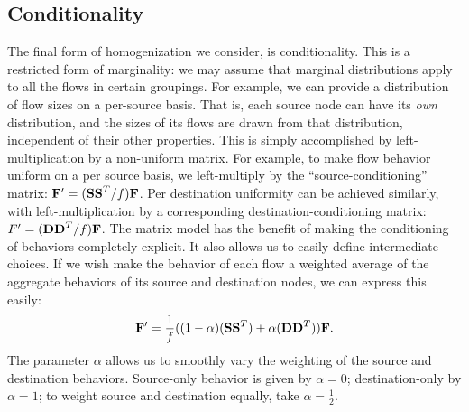 \documentclass[twocolumn,final]{svjour3}
\begin{document}
\subsection{Conditionality}

The final form of homogenization we consider, is conditionality. This is a restricted form of marginality: we may assume that marginal distributions apply to all the flows in certain groupings. For example, we can provide a distribution of flow sizes on a per-source basis. That is, each source node can have its \textit{own} distribution, and the sizes of its flows are drawn from that distribution, independent of their other properties. This is simply accomplished by left-multiplication by a non-uniform matrix. For example, to make flow behavior uniform on a per source basis, we left-multiply by the ``source-conditioning'' matrix: $\mathbf{F}'=({\mathbf{SS}}^T/f)\mathbf{F}$. Per destination uniformity can be achieved similarly, with left-multiplication by a corresponding destination-conditioning matrix: $F'=({\mathbf{DD}}^T/f)\mathbf{F}$.
The matrix model has the benefit of making the conditioning of behaviors completely explicit. It also allows us to easily define intermediate choices. If we wish make the behavior of each flow a weighted average of the aggregate behaviors of its source and destination nodes, we can express this easily:
\begin{align}
\mathbf{F}' = \frac{1}{f}((1-\alpha)({\mathbf{SS}}^T)+\alpha({\mathbf{DD}}^T))\mathbf{F}.
\end{align}
The parameter $\alpha$ allows us to smoothly vary the weighting of the source and destination behaviors. Source-only behavior is given by $\alpha=0$; destination-only by $\alpha=1$; to weight source and destination equally, take $\alpha=\frac{1}{2}$.

\end{document}
